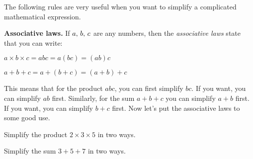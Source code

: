 \documentclass[a4paper,oneside,12pt]{article}
\begin{document}
The following rules are very useful when you want to simplify a
complicated mathematical expression.

\begin{definition}
\textbf{Associative laws.}
If ${a},\, {b},\, {c}$ are any numbers, then the
\emph{associative laws} state that you can write:
\begin{packedenumeral}
\item $a \times b \times c = abc = a (bc) = (ab) c$

\item $a + b + c = a + (b + c) = (a + b) + c$
\end{packedenumeral}
\end{definition}

This means that for the product $abc$, you can first simplify $bc$.
If you want, you can simplify $ab$ first.  Similarly, for the sum
$a + b + c$ you can simplify $a + b$ first.  If you want, you can
simplify $b + c$ first.  Now let's put the associative laws to some
good use.

\begin{exercise}
Simplify the product $2 \times 3 \times 5$ in two ways.
\end{exercise}


\begin{exercise}
Simplify the sum $3 + 5 + 7$ in two ways.
\end{exercise}

\end{document}

